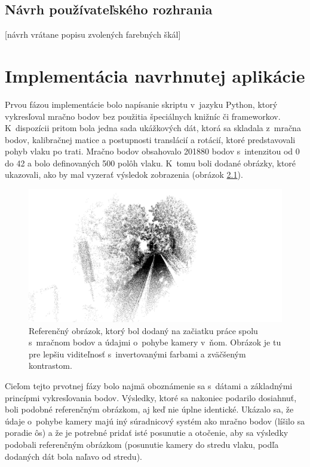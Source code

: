 \section{Návrh používateľského rozhrania}

[návrh vrátane popisu zvolených farebných škál]

\chapter{Implementácia navrhnutej aplikácie}

Prvou fázou implementácie bolo napísanie skriptu v~jazyku Python, ktorý vykresľoval mračno bodov bez použitia špeciálnych knižníc či frameworkov. K~dispozícii pritom bola jedna sada ukážkových dát, ktorá sa skladala z~mračna bodov, kalibračnej matice a postupnosti translácií a rotácií, ktoré predstavovali pohyb vlaku po trati. Mračno bodov obsahovalo 201880 bodov s~intenzitou od 0 do 42 a bolo definovaných 500 polôh vlaku. K~tomu boli dodané obrázky, ktoré ukazovali, ako by mal vyzerať výsledok zobrazenia (obrázok \ref{fig:referencny-obrazok}).

\begin{figure}[h]
    \centering
    \includegraphics[width=0.95\linewidth]{obrazky-figures/referencny_obrazok.png}
    \caption{Referenčný obrázok, ktorý bol dodaný na začiatku práce spolu s~mračnom bodov a údajmi o~pohybe kamery v~ňom. Obrázok je tu pre lepšiu viditeľnosť s~invertovanými farbami a zväčšeným kontrastom.}
    \label{fig:referencny-obrazok}
\end{figure}

Cieľom tejto prvotnej fázy bolo najmä oboznámenie sa s~dátami a základnými princípmi vykresľovania bodov. Výsledky, ktoré sa nakoniec podarilo dosiahnuť, boli podobné referenčným obrázkom, aj keď nie úplne identické. Ukázalo sa, že údaje o~pohybe kamery majú iný súradnicový systém ako mračno bodov (líšilo sa poradie ôs) a že je potrebné pridať isté posunutie a otočenie, aby sa výsledky podobali referenčným obrázkom (posunutie kamery do stredu vlaku, podľa dodaných dát bola naľavo od stredu).

